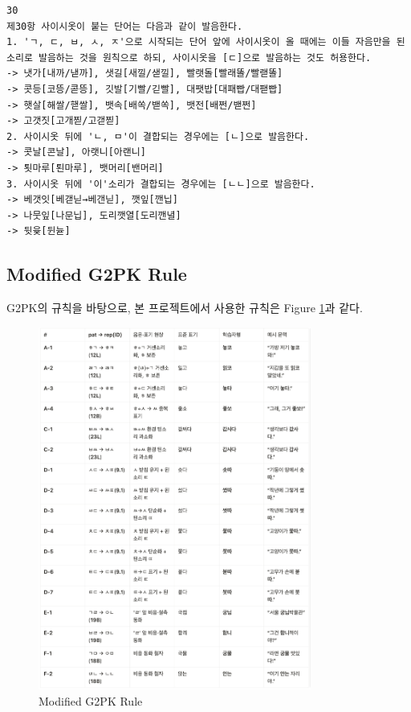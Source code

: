 \documentclass[letterpaper]{article} %
\begin{document}
\begin{verbatim}
30
제30항 사이시옷이 붙는 단어는 다음과 같이 발음한다.
1. 'ㄱ, ㄷ, ㅂ, ㅅ, ㅈ'으로 시작되는 단어 앞에 사이시옷이 올 때에는 이들 자음만을 된소리로 발음하는 것을 원칙으로 하되, 사이시옷을 [ㄷ]으로 발음하는 것도 허용한다.
-> 냇가[내까/낻까], 샛길[새낄/샏낄], 빨랫돌[빨래똘/빨랟똘]
-> 콧등[코뜽/콛뜽], 깃발[기빨/긷빨], 대팻밥[대패빱/대팯빱]
-> 햇살[해쌀/핻쌀], 뱃속[배쏙/밷쏙], 뱃전[배쩐/밷쩐]
-> 고갯짓[고개찓/고갣찓]
2. 사이시옷 뒤에 'ㄴ, ㅁ'이 결합되는 경우에는 [ㄴ]으로 발음한다.
-> 콧날[콘날], 아랫니[아랜니]
-> 툇마루[퇸마루], 뱃머리[밴머리]
3. 사이시옷 뒤에 '이'소리가 결합되는 경우에는 [ㄴㄴ]으로 발음한다.
-> 베갯잇[베갣닏→베갠닏], 깻잎[깬닙]
-> 나뭇잎[나문닙], 도리깻열[도리깬녈]
-> 뒷윷[뒨뉻]

\end{verbatim}

\subsection{Modified G2PK Rule} \label{sec:modified_g2pk_rule}
G2PK의 규칙을 바탕으로, 본 프로젝트에서 사용한 규칙은 Figure \ref{fig:modified_g2pk_rule}과 같다.
\begin{figure}[h]
    \centering
    \includegraphics[width=0.8\textwidth]{figures/modified_rules.png}
    \caption{Modified G2PK Rule}
    \label{fig:modified_g2pk_rule}
\end{figure}


\bigskip

\end{document}
